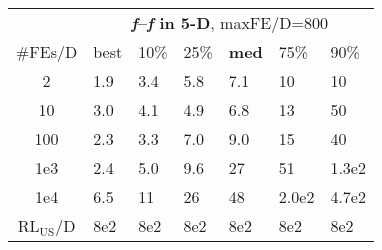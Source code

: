 \begin{tabular}{c|llllll}
 & \multicolumn{6}{|c}{\textbf{\textit{f}\raisebox{-0.35ex}{1}--\textit{f}\raisebox{-0.35ex}{24} in 5-D}, maxFE/D=800}\\
\#FEs/D & best & 10\% & 25\% & \textbf{med} & 75\% & 90\%\\
2 & \hspace*{1ex}1.9 & \hspace*{1ex}3.4 & \hspace*{1ex}5.8 & \hspace*{1ex}7.1 & 10 & 10\\
10 & \hspace*{1ex}3.0 & \hspace*{1ex}4.1 & \hspace*{1ex}4.9 & \hspace*{1ex}6.8 & 13 & 50\\
100 & \hspace*{1ex}2.3 & \hspace*{1ex}3.3 & \hspace*{1ex}7.0 & \hspace*{1ex}9.0 & 15 & 40\\
1e3 & \hspace*{1ex}2.4 & \hspace*{1ex}5.0 & \hspace*{1ex}9.6 & 27 & 51 & 1.3e2\\
1e4 & \hspace*{1ex}6.5 & 11 & 26 & 48 & 2.0e2 & 4.7e2\\
$\text{RL}_{\text{US}}$/D & 8e2 & 8e2 & 8e2 & 8e2 & 8e2 & 8e2
\end{tabular}
